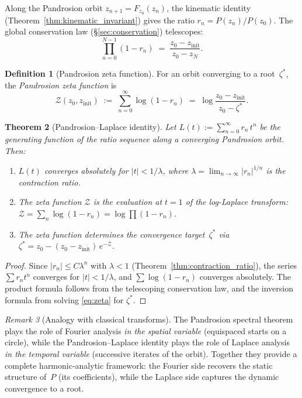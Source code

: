\documentclass[10pt,a4paper,oneside]{book}
\newtheorem{theorem}{Theorem}[chapter]
\theoremstyle{definition}
\newtheorem{definition}[theorem]{Definition}
\theoremstyle{remark}
\newtheorem{remark}[theorem]{Remark}
\begin{document}
Along the Pandrosion orbit $z_{n+1} = F_{z_0}(z_n)$, the kinematic identity (Theorem~\ref{thm:kinematic_invariant}) gives the ratio $r_n = P(z_n)/P(z_0)$.  The global conservation law (\S\ref{sec:conservation}) telescopes:
\[
  \prod_{n=0}^{N-1}(1 - r_n)
  \;=\; \frac{z_0 - z_{\mathrm{init}}}{z_0 - z_N}.
\]

\begin{definition}[Pandrosion zeta function]
\label{def:pandrosion_zeta}
For an orbit converging to a root~$\zeta^*$, the \emph{Pandrosion zeta function} is
\begin{equation}
\label{eq:zeta}
  \mathscr{Z}(z_0, z_{\mathrm{init}})
  \;:=\; \sum_{n=0}^{\infty} \log(1 - r_n)
  \;=\; \log\frac{z_0 - z_{\mathrm{init}}}{z_0 - \zeta^*}.
\end{equation}
\end{definition}

\begin{theorem}[Pandrosion--Laplace identity]
\label{thm:pandrosion_laplace}
Let $L(t) := \sum_{n=0}^{\infty} r_n\,t^n$ be the generating function of the ratio sequence along a converging Pandrosion orbit.  Then:
\begin{enumerate}[nosep]
  \item $L(t)$ converges absolutely for $|t| < 1/\lambda$, where $\lambda = \lim_{n\to\infty}|r_n|^{1/n}$ is the contraction ratio.
  \item The zeta function $\mathscr{Z}$ is the evaluation at $t = 1$ of the \emph{log-Laplace transform}: $\mathscr{Z} = \sum_{n} \log(1 - r_n) = \log\prod(1 - r_n)$.
  \item The zeta function determines the convergence target~$\zeta^*$ via $\zeta^* = z_0 - (z_0 - z_{\mathrm{init}})\,e^{-\mathscr{Z}}$.
\end{enumerate}
\end{theorem}

\begin{proof}
Since $|r_n| \leq C\lambda^n$ with $\lambda < 1$ (Theorem~\ref{thm:contraction_ratio}), the series $\sum r_n t^n$ converges for $|t| < 1/\lambda$, and $\sum\log(1-r_n)$ converges absolutely.  The product formula follows from the telescoping conservation law, and the inversion formula from solving \eqref{eq:zeta} for $\zeta^*$.
\end{proof}

\begin{remark}[Analogy with classical transforms]
The Pandrosion spectral theorem plays the role of Fourier analysis \emph{in the spatial variable} (equispaced starts on a circle), while the Pandrosion--Laplace identity plays the role of Laplace analysis \emph{in the temporal variable} (successive iterates of the orbit).  Together they provide a complete harmonic-analytic framework: the Fourier side recovers the static structure of~$P$ (its coefficients), while the Laplace side captures the dynamic convergence to a root.
\end{remark}
\end{document}

